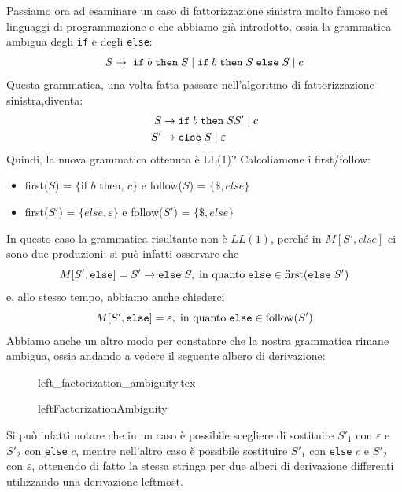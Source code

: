 \documentclass[class=book, crop=false, oneside, 12pt]{standalone}
\begin{document}
Passiamo ora ad esaminare un caso di fattorizzazione sinistra molto famoso nei linguaggi di programmazione e che abbiamo già introdotto, ossia la grammatica ambigua degli \texttt{if} e degli \texttt{else}:
\begin{equation*}
    S \rightarrow \; \textrm{\texttt{if}} \; b \; \textrm{\texttt{then}} \; S \mid \textrm{\texttt{if}} \; b \; \textrm{\texttt{then}} \; S \; \textrm{\texttt{else}} \; S \mid c  
\end{equation*}
Questa grammatica, una volta fatta passare nell'algoritmo di fattorizzazione sinistra,diventa:
\begin{align*}
    S &\rightarrow \textrm{\texttt{if}} \; b \; \textrm{\texttt{then}} \; SS' \mid c \\
    S' &\rightarrow \textrm{\texttt{else}} \; S \mid \varepsilon
\end{align*}
Quindi, la nuova grammatica ottenuta è LL(1)? Calcoliamone i first/follow: 
\begin{itemize}
    \item first(\(S\)) = \(\{\)if \(b\) then, \(c\}\) e follow(\(S\)) = \(\{\$, else\}\)
    \item first(\(S'\)) = \(\{else, \varepsilon\}\) e follow(\(S'\)) = \(\{\$, else\}\)
\end{itemize}  
In questo caso la grammatica risultante non è \(LL(1)\), perché in \(M[S', else]\) ci sono due produzioni: si può infatti osservare che 
\begin{equation*}
    M[S', \textrm{\texttt{else}}] = S' \rightarrow \textrm{\texttt{else}} \; S, \; \textrm{in quanto} \; \textrm{\texttt{else}} \in \textrm{first}(\textrm{\texttt{else}} \; S')
\end{equation*} 
e, allo stesso tempo, abbiamo anche chiederci
\begin{equation*}
    M[S', \textrm{\texttt{else}}] = \varepsilon, \; \textrm{in quanto} \; \textrm{\texttt{else}} \in \textrm{follow}(S')
\end{equation*}
Abbiamo anche un altro modo per constatare che la nostra grammatica rimane ambigua, ossia andando a vedere il seguente albero di derivazione:
\begin{figure}[H]
    \centering
    {left_factorization_ambiguity.tex}
    \caption{leftFactorizationAmbiguity}
    \label{leftFactorizationAmbiguity}
\end{figure}

Si può infatti notare che in un caso è possibile scegliere di sostituire \({S'}_1\) con \(\varepsilon\) e \({S'}_2\) con \texttt{else} \(c\), mentre nell'altro caso è possibile sostituire \({S'}_1\) con \texttt{else} \(c\) e \({S'}_2\) con \(\varepsilon\), ottenendo di fatto la stessa stringa per due alberi di derivazione differenti utilizzando una derivazione leftmost.
\end{document}
